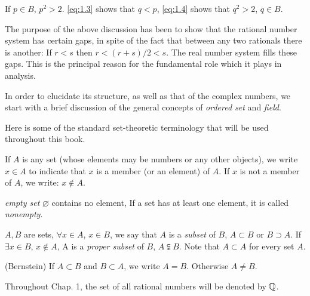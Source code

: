 If $p\in B$, $p^2>2$. \ref{eq:1.3} shows that $q<p$, \ref{eq:1.4} shows that $q^2>2$, $q\in B$.


\begin{myRemark}
    \label{Remark:1.2}
    The purpose of the above discussion has been to show that 
    the rational number system has {\color{red}certain gaps}, 
    in spite of the fact that between any two rationals there is another: 
    If $r<s$ then $r<(r+s)/2<s$.
    The real number system fills these gaps.
    This is the principal reason for the fundamental role which it plays in analysis.
\end{myRemark}


In order to elucidate its structure, as well as that of the complex numbers, 
we start with a brief discussion of the general concepts of \emph{ordered set} and \emph{field}.


Here is some of the standard set-theoretic terminology that will be used throughout this book.


\begin{myDef}
    \label{myDef:1.3}
    If $A$ is any set (whose elements may be numbers or any other objects), 
    we write $x\in A$ to indicate that $x$ is a member (or an element) of $A$.
    If $x$ is not a member of $A$, we write: $x\notin A$.

    \emph{empty set} $\varnothing$ contains no element, If a set has at least one element, it is called \emph{nonempty}.

    $A,B$ are sets, 
    $\forall x\in A$, $x\in B$, we say that $A$ is a \emph{subset} of $B$, $A \subset B$ or $B \supset A$. 
    If $\exists x\in B$, $x\notin A$, A is a \emph{proper subset} of $B$, $A \subsetneqq B$.
    Note that $A\subset A$ for every set $A$.

    (Bernstein) If $A\subset B$ and $B\subset A$, we write $A = B$. Otherwise $A \neq B$.
\end{myDef}

\begin{myDef}
    \label{myDef:1.4}
    Throughout Chap. 1, the set of all rational numbers will be denoted by ${\protect\mathbb Q} $.
\end{myDef}